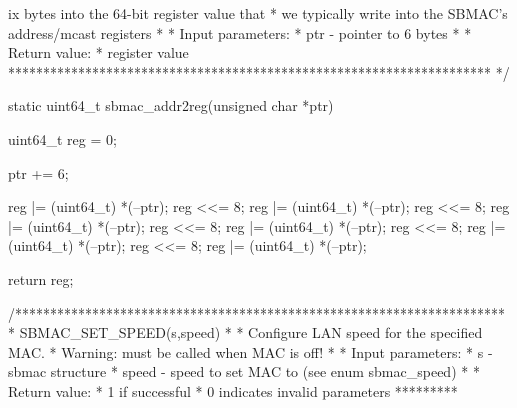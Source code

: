 ix bytes into the 64-bit register value that
 *  we typically write into the SBMAC's address/mcast registers
 *
 *  Input parameters:
 *  	   ptr - pointer to 6 bytes
 *
 *  Return value:
 *  	   register value
 ********************************************************************* */

static uint64_t sbmac_addr2reg(unsigned char *ptr)
{
	uint64_t reg = 0;

	ptr += 6;

	reg |= (uint64_t) *(--ptr);
	reg <<= 8;
	reg |= (uint64_t) *(--ptr);
	reg <<= 8;
	reg |= (uint64_t) *(--ptr);
	reg <<= 8;
	reg |= (uint64_t) *(--ptr);
	reg <<= 8;
	reg |= (uint64_t) *(--ptr);
	reg <<= 8;
	reg |= (uint64_t) *(--ptr);

	return reg;
}


/**********************************************************************
 *  SBMAC_SET_SPEED(s,speed)
 *
 *  Configure LAN speed for the specified MAC.
 *  Warning: must be called when MAC is off!
 *
 *  Input parameters:
 *  	   s - sbmac structure
 *  	   speed - speed to set MAC to (see enum sbmac_speed)
 *
 *  Return value:
 *  	   1 if successful
 *      0 indicates invalid parameters
 *********